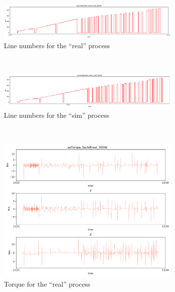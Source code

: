 \documentclass[english]{scrartcl}
\begin{document}
\begin{figure}
    \begin{subfigure}[t]{0.5\textwidth}
        \includegraphics[width=\textwidth]{actLineNumber_real.pdf}
        \caption{Line numbers for the ``real'' process}
        \label{fig:linenumbers-real}
    \end{subfigure}%
    ~
    \begin{subfigure}[t]{0.5\textwidth}
        \includegraphics[width=\textwidth]{actLineNumber_sim.pdf}
        \caption{Line numbers for the ``sim'' process}
        \label{fig:linenumbers-sim}
    \end{subfigure}%
    \\
    \begin{subfigure}[t]{0.5\textwidth}
        \includegraphics[width=\textwidth]{real_torque.pdf}
        \caption{Torque for the ``real'' process}
    \end{subfigure}%
    ~
    \begin{subfigure}[t]{0.5\textwidth}

\end{subfigure}
\end{figure}
\end{document}
